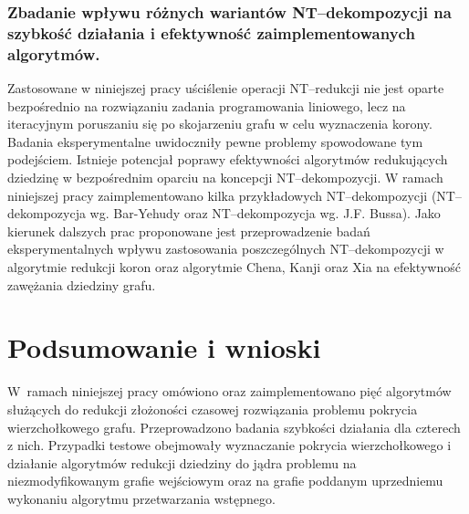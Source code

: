   \subsubsection{\textbf{Zbadanie wpływu różnych wariantów NT--dekompozycji na szybkość działania i efektywność zaimplementowanych algorytmów.}}

  Zastosowane w niniejszej pracy uściślenie operacji NT--redukcji nie jest oparte bezpośrednio na rozwiązaniu zadania programowania liniowego, lecz na iteracyjnym poruszaniu się po skojarzeniu grafu w celu wyznaczenia korony.
  Badania eksperymentalne uwidoczniły pewne problemy spowodowane tym podejściem.
  Istnieje potencjał poprawy efektywności algorytmów redukujących dziedzinę w bezpośrednim oparciu na koncepcji NT--dekompozycji.
  W ramach niniejszej pracy zaimplementowano kilka przykładowych NT--dekompozycji (NT--dekompozycja wg. Bar-Yehudy oraz NT--dekompozycja wg. J.F. Bussa).
  Jako kierunek dalszych prac proponowane jest przeprowadzenie badań eksperymentalnych wpływu zastosowania poszczególnych NT--dekompozycji w algorytmie redukcji koron oraz algorytmie Chena, Kanji oraz Xia na efektywność zawężania dziedziny grafu.

\section*{Podsumowanie i wnioski}
\addtocounter{section}{1}
  W~ramach niniejszej pracy omówiono oraz zaimplementowano pięć algorytmów służących do redukcji złożoności czasowej rozwiązania problemu pokrycia wierzchołkowego grafu. Przeprowadzono badania szybkości działania dla czterech z nich.
  Przypadki testowe obejmowały wyznaczanie pokrycia wierzchołkowego i działanie algorytmów redukcji dziedziny do jądra problemu na niezmodyfikowanym grafie wejściowym oraz na grafie poddanym uprzedniemu wykonaniu algorytmu przetwarzania wstępnego.

